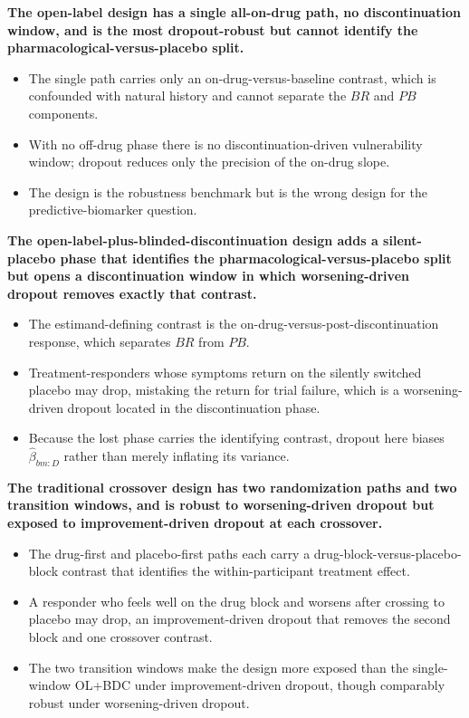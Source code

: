\documentclass[
  11pt,
]{article}
\begin{document}
\textbf{The open-label design has a single all-on-drug path, no discontinuation window, and is the most dropout-robust but cannot identify the pharmacological-versus-placebo split.}

\begin{itemize}\setlength{\itemsep}{2pt}\setlength{\parskip}{0pt}
\item The single path carries only an on-drug-versus-baseline contrast, which is confounded with natural history and cannot separate the $BR$ and $PB$ components.
\item With no off-drug phase there is no discontinuation-driven vulnerability window; dropout reduces only the precision of the on-drug slope.
\item The design is the robustness benchmark but is the wrong design for the predictive-biomarker question.
\end{itemize}

\textbf{The open-label-plus-blinded-discontinuation design adds a silent-placebo phase that identifies the pharmacological-versus-placebo split but opens a discontinuation window in which worsening-driven dropout removes exactly that contrast.}

\begin{itemize}\setlength{\itemsep}{2pt}\setlength{\parskip}{0pt}
\item The estimand-defining contrast is the on-drug-versus-post-discontinuation response, which separates $BR$ from $PB$.
\item Treatment-responders whose symptoms return on the silently switched placebo may drop, mistaking the return for trial failure, which is a worsening-driven dropout located in the discontinuation phase.
\item Because the lost phase carries the identifying contrast, dropout here biases $\hat{\beta}_{bm:D}$ rather than merely inflating its variance.
\end{itemize}

\textbf{The traditional crossover design has two randomization paths and two transition windows, and is robust to worsening-driven dropout but exposed to improvement-driven dropout at each crossover.}

\begin{itemize}\setlength{\itemsep}{2pt}\setlength{\parskip}{0pt}
\item The drug-first and placebo-first paths each carry a drug-block-versus-placebo-block contrast that identifies the within-participant treatment effect.
\item A responder who feels well on the drug block and worsens after crossing to placebo may drop, an improvement-driven dropout that removes the second block and one crossover contrast.
\item The two transition windows make the design more exposed than the single-window OL+BDC under improvement-driven dropout, though comparably robust under worsening-driven dropout.
\end{itemize}
\end{document}
